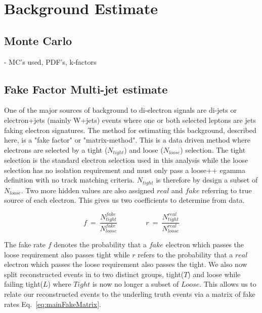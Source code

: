 \chapter{Background Estimate }

\section{Monte Carlo }
{\normalsize - MC's used, PDF's, k-factors}

\section{Fake Factor Multi-jet estimate }

One of the major sources of background to di-electron signals are di-jets or electron+jets (mainly W+jets) events where one or both selected leptons are jets faking electron signatures. The method for estimating this background, described here, is a "fake factor" or "matrix-method". This is a data driven method where electrons are selected by a tight ($N_{tight}$) and loose ($N_{loose}$) selection. The tight selection is the standard electron selection used in this analysis while the loose selection has no isolation requirement and must only pass a loose++ egamma definition with no track matching criteria. $N_{tight}$ is therefore by design a subset of $N_{loose}$. Two more hidden values are also assigned $real$ and $fake$ referring to true source of each electron. This gives us two coefficients to determine from data.

\begin{equation} \label{eq:fakeRate}
   f~=~\frac{N^{fake}_{tight}}{N^{fake}_{loose}} \qquad \qquad r~=~\frac{N^{real}_{tight}}{N^{real}_{loose}}
\end{equation}

The fake rate $f$ denotes the probability that a $fake$ electron which passes the loose requirement also passes tight while $r$ refers to the probability that a $real$ electron which passes the loose requirement also passes the tight.
We also now split reconstructed events in to two distinct groups, tight($T$) and loose while failing tight($L$) where $Tight$ is now no longer a subset of $Loose$. This allows us to relate our reconstructed events to the underling truth events via a matrix of fake rates Eq.~\ref{eq:mainFakeMatrix}.

